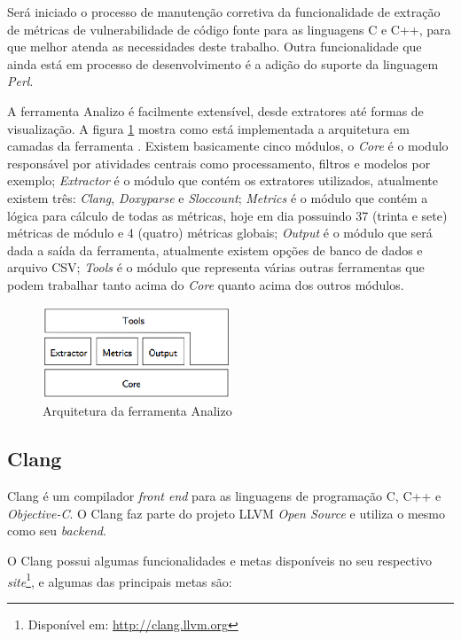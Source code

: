 Será iniciado o processo de manutenção corretiva da funcionalidade de extração de métricas de vulnerabilidade de código fonte 
para as linguagens C e C++, para que melhor atenda as necessidades deste trabalho. Outra funcionalidade que ainda está em 
processo de desenvolvimento é a adição do suporte da linguagem \textit{Perl}.

A ferramenta Analizo é facilmente extensível, desde extratores até formas de visualização. A figura \ref{archanalizo} mostra
como está implementada a arquitetura em camadas da ferramenta \cite{analizoartigo}. Existem basicamente cinco módulos, o 
\textit{Core} é o modulo responsável por atividades centrais como processamento, filtros e modelos por exemplo; 
\textit{Extractor} é o módulo que contém os extratores utilizados, atualmente existem três: \textit{Clang}, \textit{Doxyparse}
e \textit{Sloccount}; \textit{Metrics} é o módulo que contém a lógica para cálculo de todas as métricas, hoje em dia possuindo
37 (trinta e sete) métricas de módulo e 4 (quatro) métricas globais; \textit{Output} é o módulo que será dada a saída da 
ferramenta, atualmente existem opções de banco de dados e arquivo CSV; \textit{Tools} é o módulo que representa várias outras
ferramentas que podem trabalhar tanto acima do \textit{Core} quanto acima dos outros módulos.

\begin{figure}[h]
  \centering
  \includegraphics[width=0.5\textwidth]
      {figuras/analizo.eps}
  \caption{Arquitetura da ferramenta Analizo}
  \label{archanalizo}
\end{figure}

\subsection{Clang} \label{clang}

Clang é um compilador \textit{front end} para as linguagens de programação C, C++ e \textit{Objective-C}. O Clang faz parte
do projeto LLVM \textit{Open Source} e utiliza o mesmo como seu \textit{backend}. 

O Clang possui algumas funcionalidades e metas disponíveis no seu respectivo
\textit{site}\footnote{Disponível em: \url{http://clang.llvm.org}}, e
algumas das principais metas são:

